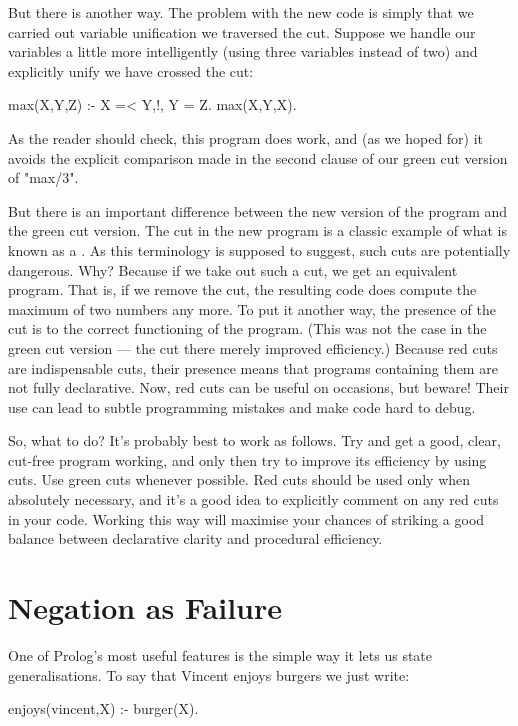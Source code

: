 But there is another way. The problem with the new code is simply that
we carried out variable unification  we traversed the
cut. Suppose we handle our variables a little more intelligently
(using three variables instead of two) and explicitly unify
 we have crossed the cut:
\begin{LPNcodedisplay}
max(X,Y,Z) :- X =< Y,!, Y = Z.
max(X,Y,X).
\end{LPNcodedisplay}
As the reader should check, this program does work, and (as we hoped
for) it avoids the explicit comparison made in the second clause of
our green cut version of "max/3".

But there is an important difference between the new version of the
program and the green cut version.  The cut in the new program is a
classic example of what is known as a .  As this
terminology is supposed to suggest, such cuts are potentially
dangerous.  Why?  Because if we take out such a cut, we
 get an equivalent program. That is, if we remove the
cut, the resulting code does  compute the maximum of two
numbers any more. To put it another way, the presence of the cut is
 to the correct functioning of the
program. (This was not the case in the  green cut version --- the
cut there merely
improved efficiency.) Because red cuts are
indispensable cuts, their presence means that programs containing them
are not fully declarative. Now, red cuts can be useful on occasions,
but beware!  Their use can lead to subtle programming mistakes and
make code hard to debug.

So, what to do? It's probably best to work as follows.  Try and get a
good, clear, cut-free program working, and only then try to improve
its efficiency by using cuts. Use green cuts whenever possible.  Red
cuts should be used only when absolutely necessary, and it's a good
idea to explicitly comment on any red cuts in your code. Working this
way will maximise your chances of striking a good balance between
declarative clarity and procedural efficiency.

\section{Negation as Failure}\label{SEC.L10.NEGATION.AS.FAILURE}

One of Prolog's most useful features is the simple way it lets us
state generalisations.  To say that Vincent enjoys burgers we just
write:
\begin{LPNcodedisplay}
enjoys(vincent,X) :- burger(X).
\end{LPNcodedisplay}

